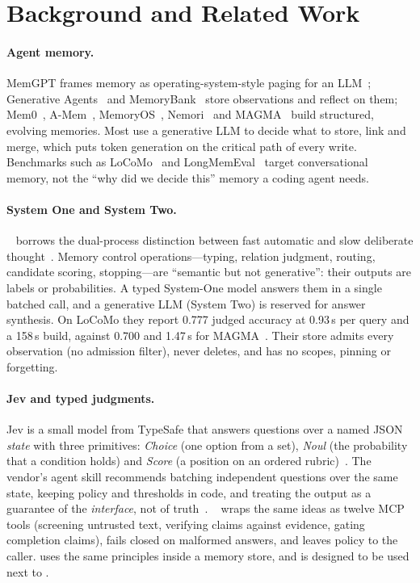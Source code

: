 \section{Background and Related Work}
\label{sec:background}

\paragraph{Agent memory.} MemGPT frames memory as operating-system-style paging for an LLM~\cite{packer2023memgpt}; Generative Agents~\cite{park2023generative} and MemoryBank~\cite{zhong2024memorybank} store observations and reflect on them; Mem0~\cite{chhikara2025mem0}, A-Mem~\cite{xu2025amem}, MemoryOS~\cite{kang2025memoryos}, Nemori~\cite{nan2025nemori} and MAGMA~\cite{jiang2026magma} build structured, evolving memories. Most use a generative LLM to decide what to store, link and merge, which puts token generation on the critical path of every write. Benchmarks such as LoCoMo~\cite{maharana2024locomo} and LongMemEval~\cite{wu2024longmemeval} target conversational memory, not the ``why did we decide this'' memory a coding agent needs.

\paragraph{System One and System Two.} \jevmempaper{}~\cite{jiang2026jevmem} borrows the dual-process distinction between fast automatic and slow deliberate thought~\cite{evans2008dual}. Memory control operations---typing, relation judgment, routing, candidate scoring, stopping---are ``semantic but not generative'': their outputs are labels or probabilities. A typed System-One model answers them in a single batched call, and a generative LLM (System Two) is reserved for answer synthesis. On LoCoMo they report 0.777 judged accuracy at 0.93\,s per query and a 158\,s build, against 0.700 and 1.47\,s for MAGMA~\cite{jiang2026jevmem}. Their store admits every observation (no admission filter), never deletes, and has no scopes, pinning or forgetting.

\paragraph{Jev and typed judgments.} Jev is a small model from TypeSafe that answers questions over a named JSON \emph{state} with three primitives: \emph{Choice} (one option from a set), \emph{Noul} (the probability that a condition holds) and \emph{Score} (a position on an ordered rubric)~\cite{typesafe2026,typesafeskill}. The vendor's agent skill recommends batching independent questions over the same state, keeping policy and thresholds in code, and treating the output as a guarantee of the \emph{interface}, not of truth~\cite{typesafeskill}. ~\cite{jevmcp} wraps the same ideas as twelve MCP tools (screening untrusted text, verifying claims against evidence, gating completion claims), fails closed on malformed answers, and leaves policy to the caller. \jevmem{} uses the same principles inside a memory store, and is designed to be used next to .

